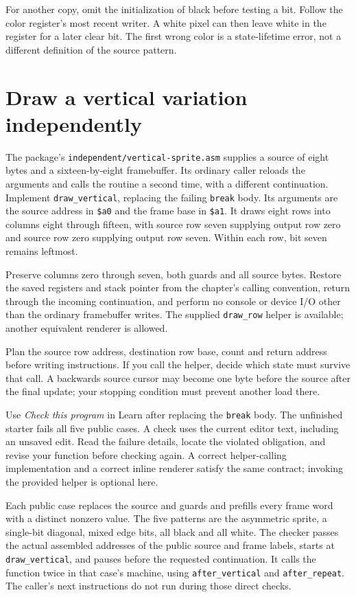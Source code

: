 For another copy, omit the initialization of black before testing a bit. Follow
the color register's most recent writer. A white pixel can then leave white in the
register for a later clear bit. The first wrong color is a state-lifetime error,
not a different definition of the source pattern.

\section{Draw a vertical variation independently}

The package's \texttt{independent/vertical-sprite.asm} supplies a source of
eight bytes and a sixteen-by-eight framebuffer. Its ordinary caller reloads the
arguments and calls the routine a second time, with a different continuation. Implement \texttt{draw\_vertical}, replacing
the failing \texttt{break} body. Its arguments are the source address in
\texttt{\$a0} and the frame base in \texttt{\$a1}. It draws eight rows into
columns eight through fifteen, with source row seven supplying output row zero
and source row zero supplying output row seven. Within each row, bit seven remains
leftmost.

Preserve columns zero through seven, both guards and all source bytes. Restore
the saved registers and stack pointer from the chapter's calling convention,
return through the incoming continuation, and perform no console or device I/O
other than the ordinary framebuffer writes. The supplied \texttt{draw\_row}
helper is available; another equivalent renderer is allowed.

Plan the source row address, destination row base, count and return address before
writing instructions. If you call the helper, decide which state must survive
that call. A backwards source cursor may become one byte before the source after
the final update; your stopping condition must prevent another load there.

Use \emph{Check this program} in Learn after replacing the \texttt{break}
body. The unfinished starter fails all five public cases. A check uses the current
editor text, including an unsaved edit. Read the failure details, locate the
violated obligation, and revise your function before checking again. A correct
helper-calling implementation and a correct inline renderer satisfy the same
contract; invoking the provided helper is optional here.

Each public case replaces the source and guards and prefills every frame word
with a distinct nonzero value. The five patterns are the asymmetric sprite,
a single-bit diagonal, mixed edge bits, all black and all white. The checker
passes the actual assembled addresses of the public source and frame labels,
starts at \texttt{draw\_vertical}, and pauses before the requested continuation.
It calls the function twice in that case's machine, using
\texttt{after\_vertical} and \texttt{after\_repeat}. The caller's next
instructions do not run during those direct checks.


